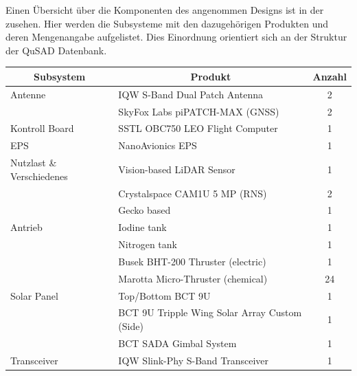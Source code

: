 				Einen Übersicht über die Komponenten des angenommen Designs ist in der  zusehen. Hier werden die Subsysteme mit den dazugehörigen Produkten und deren Mengenangabe aufgelistet. Dies Einordnung orientiert sich an der Struktur der QuSAD Datenbank.
				\begin{table}[!ht]
				\centering
\begin{tabular}{|l|l|c|}
\hline
\multicolumn{1}{|c|}{Subsystem} & \multicolumn{1}{c|}{Produkt}    	            & Anzahl \\ \hline
Antenne                         & IQW S-Band Dual Patch Antenna                 & 2      \\ \hline
                                & SkyFox Labs piPATCH-MAX (GNSS)                & 2      \\ \hline
Kontroll Board                  & SSTL OBC750 LEO Flight Computer               & 1      \\ \hline
EPS                             & NanoAvionics EPS                              & 1      \\ \hline
Nutzlast \& Verschiedenes       & Vision-based LiDAR Sensor                     & 1      \\ \hline
                                & Crystalspace CAM1U 5 MP (RNS)                 & 2      \\ \hline
                                & Gecko based                                   & 1      \\ \hline
Antrieb                         & Iodine tank                                   & 1      \\ \hline
                                & Nitrogen tank                                 & 1      \\ \hline
                                & Busek BHT-200 Thruster (electric)             & 1      \\ \hline
                                & Marotta Micro-Thruster (chemical)             & 24     \\ \hline
Solar Panel                     & Top/Bottom BCT 9U                             & 1      \\ \hline
                                & BCT 9U Tripple Wing Solar Array Custom (Side) & 1      \\ \hline
                                & BCT SADA Gimbal System                        & 1      \\ \hline
Transceiver                     & IQW Slink-Phy S-Band Transceiver              & 1      \\ \hline

\end{tabular}
\end{table}
